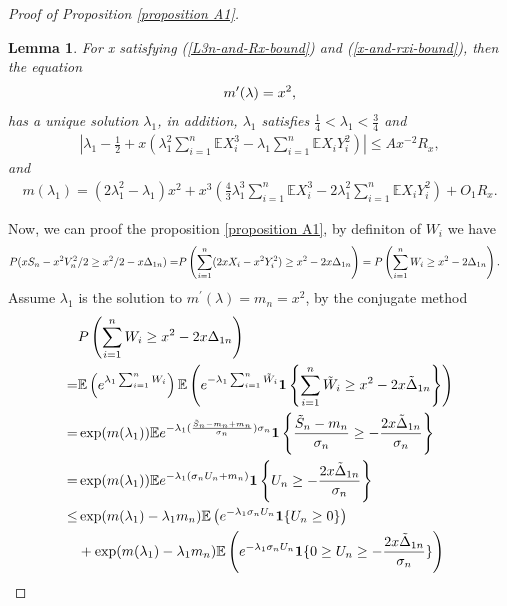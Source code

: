 \documentclass[bj,authoryear]{imsart}
\numberwithin{equation}{section}
\theoremstyle{plain}
\newtheorem{lem}{Lemma}[section]
\theoremstyle{definition}
\begin{document}
\begin{proof}[Proof of Proposition \ref{proposition A1}]
\begin{lem}\label{lem-solution-lambda}
For x satisfying (\ref{L3n-and-Rx-bound}) and (\ref{x-and-rxi-bound}), then the equation
\begin{align}
  m^{\prime}(\lambda) = x^2,\notag
\end{align}
has a unique solution $\lambda_1$, in addition, $\lambda_1$ satisfies $\frac{1}{4}<\lambda_1<\frac{3}{4}$ and 
\begin{align}
  \left|\lambda_1 - \frac{1}{2} + x\left(\lambda_1^2\sum_{i = 1}^{n}\mathbb{E}X_{i}^{3}-\lambda_1\sum_{i = 1}^{n}\mathbb{E}X_{i}Y_{i}^{2}\right)\right|\leq Ax^{-2}R_{x},\label{lambda-1}
\end{align}
and 
\begin{align}
  m(\lambda_1) = (2\lambda_{1}^{2}-\lambda_1)x^2+x^3\left(\frac{4}{3}\lambda_{1}^{3}\sum_{i = 1}^{n}\mathbb{E}X_{i}^{3}-2\lambda_{1}^{2}\sum_{i = 1}^{n}\mathbb{E}X_{i}Y_{i}^{2}\right)+O_1R_{x}.\label{m-lambda-1}
\end{align}
\end{lem}
Now, we can proof the proposition \ref{proposition A1}, by definiton of $W_i$ we have
\begin{align}
  P(xS_n-x^2V_{n}^{2}/2\geq x^2/2-x\Delta_{1n}) = & P\left(\sum_{i=1}^{n}(2xX_i-x^2Y_{i}^{2})\geq x^2-2x\Delta_{1n}\right)= P\left(\sum_{i = 1}^{n}W_i \geq x^2-2\Delta_{1n}\right). \notag
\end{align}
Assume $\lambda_1$ is the solution to $m^{\prime}(\lambda) = m_n = x^2$, by the conjugate method
\begin{align}
  &P\left(\sum_{i=1}^{n}W_i\geq x^2-2x\Delta_{1n}\right)\notag\\
  =&\mathbb{E}\left(e^{\lambda_1\sum_{i=1}^{n}W_i}\right)\mathbb{E}\left(e^{-\lambda_1 \sum_{i=1}^{n}\tilde{W}_i}{\bf 1}\left\{\sum_{i=1}^{n}\tilde{W}_i\geq x^2-2x\tilde{\Delta}_{1n}\right\}\right)\notag\\
  =&\exp(m(\lambda_1))\mathbb{E} e^{-\lambda_1(\frac{\tilde{S}_n-m_n+m_n}{\sigma_n})\sigma_n}{\bf 1}\left\{\frac{\tilde{S}_n-m_n}{\sigma_n}\geq -\frac{2x\tilde{\Delta}_{1n}}{\sigma_n}\right\}\notag\\
  =&\exp(m(\lambda_1))\mathbb{E} e^{-\lambda_1(\sigma_n U_n+m_n)}{\bf 1}\left\{U_n\geq -\frac{2x\tilde{\Delta}_{1n}}{\sigma_n}\right\}\notag\\
  \leq &\exp(m(\lambda_1)-\lambda_1m_n)\mathbb{E} \left(e^{-\lambda_1\sigma_nU_n}{\bf 1}\{U_n\geq 0\}\right)\notag\\
  &+\exp(m(\lambda_1)-\lambda_1m_n)\mathbb{E} \left(e^{-\lambda_1\sigma_n U_n}{\bf 1}\{0\geq U_n\geq -\frac{2x\tilde{\Delta}_{1n}}{\sigma_n}\}\right)\notag\\

\end{align}
\end{proof}
\end{document}
